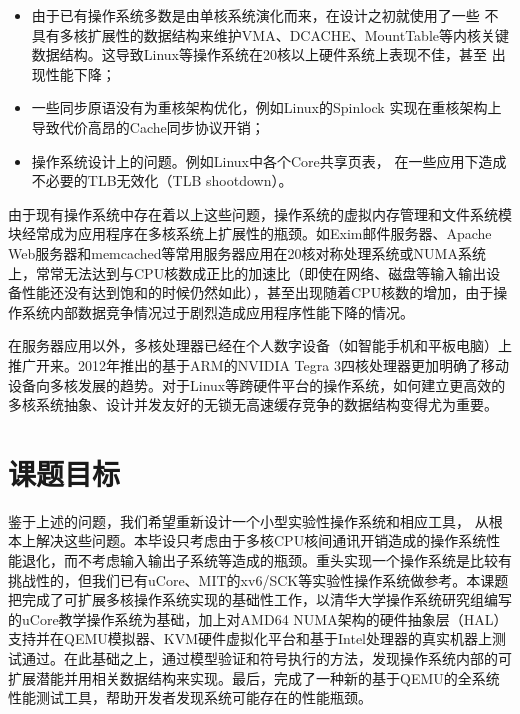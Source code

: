 	\begin{itemize}
		\item
	由于已有操作系统多数是由单核系统演化而来，在设计之初就使用了一些
	不具有多核扩展性的数据结构来维护VMA、DCACHE、MountTable等内核关键
	数据结构。这导致Linux等操作系统在20核以上硬件系统上表现不佳，甚至
	出现性能下降\cite{linux:osdi10}；
		\item 一些同步原语没有为重核架构优化，例如Linux的Spinlock
			实现在重核架构上导致代价高昂的Cache同步协议开销；
		\item
			操作系统设计上的问题。例如Linux中各个Core共享页表，
			在一些应用下造成不必要的TLB无效化（TLB shootdown）。
	\end{itemize}

由于现有操作系统中存在着以上这些问题，操作系统的虚拟内存管理和文件系统模块经常成为应用程序在多核系统上扩展性的瓶颈。如Exim邮件服务器、Apache
Web服务器和memcached等常用服务器应用在20核对称处理系统或NUMA系统上，常常无法达到与CPU核数成正比的加速比（即使在网络、磁盘等输入输出设备性能还没有达到饱和的时候仍然如此），甚至出现随着CPU核数的增加，由于操作系统内部数据竞争情况过于剧烈造成应用程序性能下降的情况\cite{linux:osdi10}。

在服务器应用以外，多核处理器已经在个人数字设备（如智能手机和平板电脑）上推广开来。2012年推出的基于ARM的NVIDIA
Tegra
3四核处理器更加明确了移动设备向多核发展的趋势。对于Linux等跨硬件平台的操作系统，如何建立更高效的多核系统抽象、设计并发友好的无锁无高速缓存竞争的数据结构变得尤为重要。

\section{课题目标}

	鉴于上述的问题，我们希望重新设计一个小型实验性操作系统和相应工具，
	从根本上解决这些问题。本毕设只考虑由于多核CPU核间通讯开销造成的操作系统性能退化，而不考虑输入输出子系统等造成的瓶颈。重头实现一个操作系统是比较有挑战性的，但我们已有uCore、MIT的xv6/SCK等实验性操作系统做参考。本课题把完成了可扩展多核操作系统实现的基础性工作，以清华大学操作系统研究组编写的uCore教学操作系统为基础，加上对AMD64
	NUMA架构的硬件抽象层（HAL）支持并在QEMU模拟器、KVM硬件虚拟化平台和基于Intel处理器的真实机器上测试通过。在此基础之上，通过模型验证和符号执行的方法，发现操作系统内部的可扩展潜能并用相关数据结构来实现。最后，完成了一种新的基于QEMU的全系统性能测试工具，帮助开发者发现系统可能存在的性能瓶颈。


